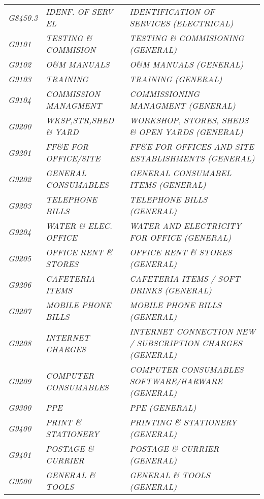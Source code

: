 \begin{landscape}
\begin{longtable}[l]{l%
                  l|%
                  l|}
\itshape G8450.3     &\itshape IDENF. OF SERV EL   &\itshape IDENTIFICATION OF SERVICES (ELECTRICAL)   \\
\itshape G9101       &\itshape TESTING \& COMMISION   &\itshape TESTING \& COMMISIONING (GENERAL)   \\
\itshape G9102       &\itshape O\&M MANUALS   &\itshape O\&M MANUALS (GENERAL)   \\
\itshape G9103       &\itshape TRAINING   &\itshape TRAINING (GENERAL)   \\
\itshape G9104       &\itshape COMMISSION MANAGMENT   &\itshape COMMISSIONING MANAGMENT  (GENERAL)   \\
\itshape G9200       &\itshape WKSP,STR,SHED \& YARD   &\itshape WORKSHOP, STORES, SHEDS \& OPEN YARDS (GENERAL)   \\
\itshape G9201       &\itshape FF\&E FOR OFFICE/SITE   &\itshape FF\&E FOR OFFICES AND SITE ESTABLISHMENTS (GENERAL)   \\
\itshape G9202       &\itshape GENERAL CONSUMABLES   &\itshape GENERAL CONSUMABEL ITEMS (GENERAL)   \\
\itshape G9203       &\itshape TELEPHONE BILLS   &\itshape TELEPHONE BILLS (GENERAL)   \\
\itshape G9204       &\itshape WATER \& ELEC. OFFICE   &\itshape WATER AND ELECTRICITY FOR OFFICE (GENERAL)   \\
\itshape G9205       &\itshape OFFICE RENT \& STORES   &\itshape OFFICE RENT \& STORES (GENERAL)   \\
\itshape G9206       &\itshape CAFETERIA ITEMS   &\itshape CAFETERIA ITEMS / SOFT DRINKS (GENERAL)   \\
\itshape G9207       &\itshape MOBILE PHONE BILLS   &\itshape MOBILE PHONE BILLS (GENERAL)   \\
\itshape G9208       &\itshape INTERNET CHARGES   &\itshape INTERNET CONNECTION NEW / SUBSCRIPTION CHARGES  (GENERAL)   \\
\itshape G9209       &\itshape COMPUTER CONSUMABLES   &\itshape COMPUTER CONSUMABLES SOFTWARE/HARWARE (GENERAL)   \\
\itshape G9300       &\itshape PPE   &\itshape PPE (GENERAL)   \\
\itshape G9400       &\itshape PRINT \& STATIONERY   &\itshape PRINTING \& STATIONERY (GENERAL)   \\
\itshape G9401       &\itshape POSTAGE \& CURRIER   &\itshape POSTAGE \& CURRIER (GENERAL)   \\
\itshape G9500       &\itshape GENERAL \& TOOLS   &\itshape GENERAL \& TOOLS (GENERAL)   \\

\end{longtable}
\end{landscape}
